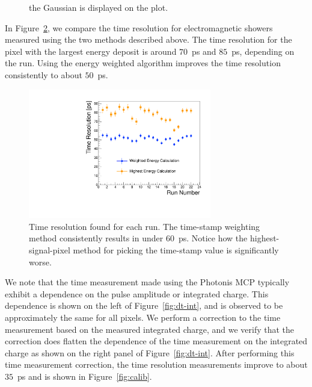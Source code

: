 \documentclass[12pt]{article}
\begin{document}
{\begin{figure}[htbp]
{    the Gaussian is displayed on the plot.}
  \label{fig:exdt}
\end{figure}
In Figure~\ref{fig:wtres}, we compare the time resolution for electromagnetic
showers measured using the two methods described above. The time resolution for
the pixel with the largest energy deposit is around $70$~ps and $85$~ps,
depending on the run. Using the energy weighted algorithm improves the time
resolution consistently to about $50$~ps. 
\begin{figure}[htbp]
  \centering
  \includegraphics[width=8cm]{Images/wtres/tresperrun.pdf}
  \caption{\small Time resolution found for each run. The time-stamp weighting
    method consistently results in under $60$~ps. Notice how the
    highest-signal-pixel method for picking the time-stamp value is significantly
    worse.}
  \label{fig:wtres}
\end{figure}
We note that the time measurement made using the Photonis MCP typically exhibit
a dependence on the pulse amplitude or integrated charge. This dependence is
shown on the left of Figure~\ref{fig:dt-int}, and is observed to be 
approximately the same for all pixels. We perform a correction to the
time measurement based on the measured integrated charge, and we verify that the
correction does flatten the dependence of the time measurement on the integrated
charge as shown on the right panel of Figure~\ref{fig:dt-int}. After performing this time 
measurement correction, the time resolution measurements improve to about 
$35$~ps and is shown in Figure~\ref{fig:calib}.

}
\end{document}

